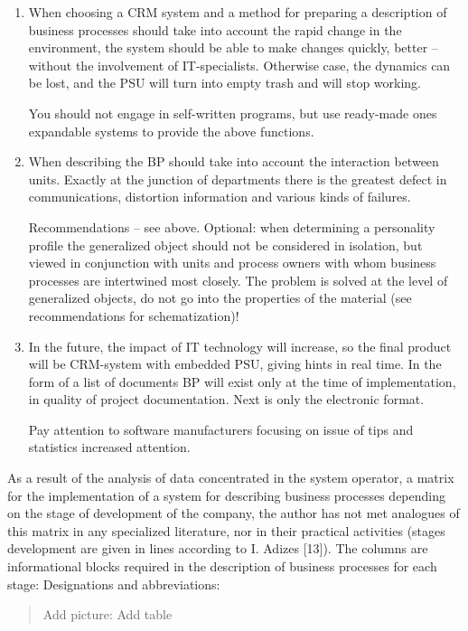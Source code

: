 \documentclass[11pt,a4paper]{book}
\newcommand{\addpicture}[1]{
  \begin{quote} Add picture: #1\end{quote}
}
\begin{document}
\begin{enumerate}
\item When choosing a CRM system and a method for preparing a description of
  business processes should take into account the rapid change in the
  environment, the system should be able to make changes quickly, better --
  without the involvement of IT-specialists. Otherwise case, the dynamics can
  be lost, and the PSU will turn into empty trash and will stop working.

  You should not engage in self-written programs, but use ready-made ones
  expandable systems to provide the above functions.

\item When describing the BP should take into account the interaction between
  units. Exactly at the junction of departments there is the greatest defect
  in communications, distortion information and various kinds of failures.

  Recommendations -- see above. Optional: when determining a personality
  profile the generalized object should not be considered in isolation, but viewed in
  conjunction with units and process owners with whom business processes are
  intertwined most closely. The problem is solved at the level of generalized objects, do
  not go into the properties of the material (see recommendations for
  schematization)!

\item In the future, the impact of IT technology will increase, so the final
  product will be CRM-system with embedded PSU, giving hints in real time.  In
  the form of a list of documents BP will exist only at the time of
  implementation, in quality of project documentation. Next is only the
  electronic format.

  Pay attention to software manufacturers focusing on issue of tips and
  statistics increased attention.
\end{enumerate}

As a result of the analysis of data concentrated in the system operator, a
matrix for the implementation of a system for describing business processes
depending on the stage of development of the company, the author has not met
analogues of this matrix in any specialized literature, nor in their practical
activities (stages development are given in lines according to I. Adizes
[13]). The columns are informational blocks required in the description of
business processes for each stage: Designations and abbreviations:

\addpicture{Add table}
\end{document}
